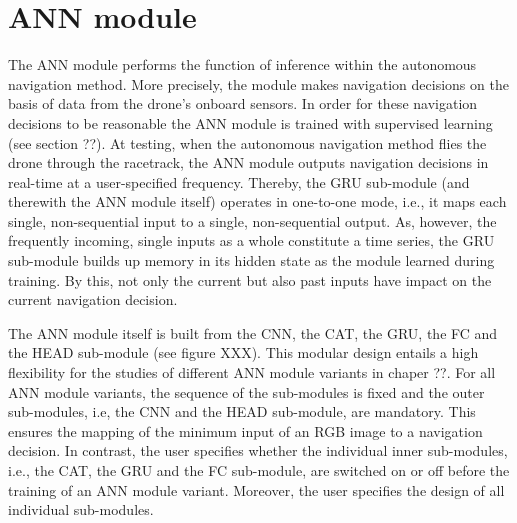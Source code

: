 \section{ANN module} \label{sec:ann_module}
The ANN module performs the function of inference
within the autonomous navigation method.
More precisely, the module makes navigation decisions
on the basis of data from the drone's onboard sensors.
In order for these navigation decisions to be reasonable
the ANN module is trained with supervised learning (see section ??).
At testing, 
when the autonomous navigation method flies the drone through the racetrack,
the ANN module outputs navigation decisions in real-time at a user-specified frequency.
Thereby, the GRU sub-module (and therewith the ANN module itself)
operates in one-to-one mode,
i.e., it maps each single, non-sequential input to a single, non-sequential output.
As, however, the frequently incoming, single inputs as a whole constitute a time series,
the GRU sub-module builds up memory in its hidden state
as the module learned during training.
By this, not only the current but also 
past inputs have impact on the current navigation decision.


The ANN module itself is built 
from the CNN, the CAT, the GRU, the FC and the HEAD sub-module
(see figure XXX).
This modular design entails a high flexibility for the studies
of different ANN module variants in chaper ??.
For all ANN module variants,
the sequence of the sub-modules is fixed
and the outer sub-modules, i.e, the CNN and the HEAD sub-module,
are mandatory.
This ensures the mapping 
of the minimum input of an RGB image to a navigation decision.
In contrast, the user specifies whether
the individual inner sub-modules,
i.e., the CAT, the GRU and the FC sub-module,
are switched on or off
before the training of an ANN module variant.
Moreover, the user specifies the design of all individual sub-modules.



